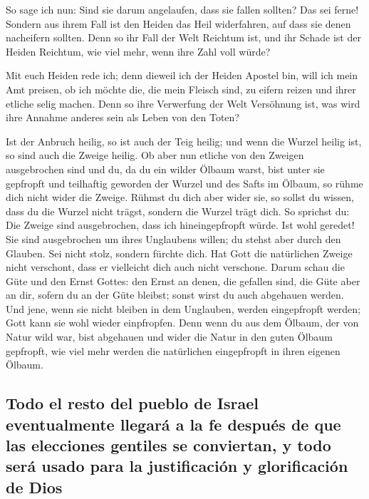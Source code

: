  So sage ich nun: Sind sie darum angelaufen, dass sie
fallen sollten? Das sei ferne! Sondern aus ihrem Fall ist den Heiden das
Heil widerfahren, auf dass sie denen nacheifern sollten. 
Denn so ihr Fall der Welt Reichtum ist, und ihr Schade ist der Heiden
Reichtum, wie viel mehr, wenn ihre Zahl voll würde?

 Mit euch Heiden rede ich; denn dieweil ich der Heiden
Apostel bin, will ich mein Amt preisen,  ob ich möchte
die, die mein Fleisch sind, zu eifern reizen und ihrer etliche selig
machen.  Denn so ihre Verwerfung der Welt Versöhnung ist,
was wird ihre Annahme anderes sein als Leben von den Toten?

 Ist der Anbruch heilig, so ist auch der Teig heilig; und
wenn die Wurzel heilig ist, so sind auch die Zweige heilig.
 Ob aber nun etliche von den Zweigen ausgebrochen sind
und du, da du ein wilder Ölbaum warst, bist unter sie gepfropft und
teilhaftig geworden der Wurzel und des Safts im Ölbaum, 
so rühme dich nicht wider die Zweige. Rühmst du dich aber wider sie, so
sollst du wissen, dass du die Wurzel nicht trägst, sondern die Wurzel
trägt dich.  So sprichst du: Die Zweige sind
ausgebrochen, dass ich hineingepfropft würde.  Ist wohl
geredet! Sie sind ausgebrochen um ihres Unglaubens willen; du stehst
aber durch den Glauben. Sei nicht stolz, sondern fürchte dich.
 Hat Gott die natürlichen Zweige nicht verschont, dass er
vielleicht dich auch nicht verschone.  Darum schau die
Güte und den Ernst Gottes: den Ernst an denen, die gefallen sind, die
Güte aber an dir, sofern du an der Güte bleibst; sonst wirst du auch
abgehauen werden.  Und jene, wenn sie nicht bleiben in
dem Unglauben, werden eingepfropft werden; Gott kann sie wohl wieder
einpfropfen.  Denn wenn du aus dem Ölbaum, der von Natur
wild war, bist abgehauen und wider die Natur in den guten Ölbaum
gepfropft, wie viel mehr werden die natürlichen eingepfropft in ihren
eigenen Ölbaum.

\hypertarget{todo-el-resto-del-pueblo-de-israel-eventualmente-llegaruxe1-a-la-fe-despuuxe9s-de-que-las-elecciones-gentiles-se-conviertan-y-todo-seruxe1-usado-para-la-justificaciuxf3n-y-glorificaciuxf3n-de-dios}{%
\subsection{Todo el resto del pueblo de Israel eventualmente llegará a
la fe después de que las elecciones gentiles se conviertan, y todo será
usado para la justificación y glorificación de
Dios}\label{todo-el-resto-del-pueblo-de-israel-eventualmente-llegaruxe1-a-la-fe-despuuxe9s-de-que-las-elecciones-gentiles-se-conviertan-y-todo-seruxe1-usado-para-la-justificaciuxf3n-y-glorificaciuxf3n-de-dios}}


